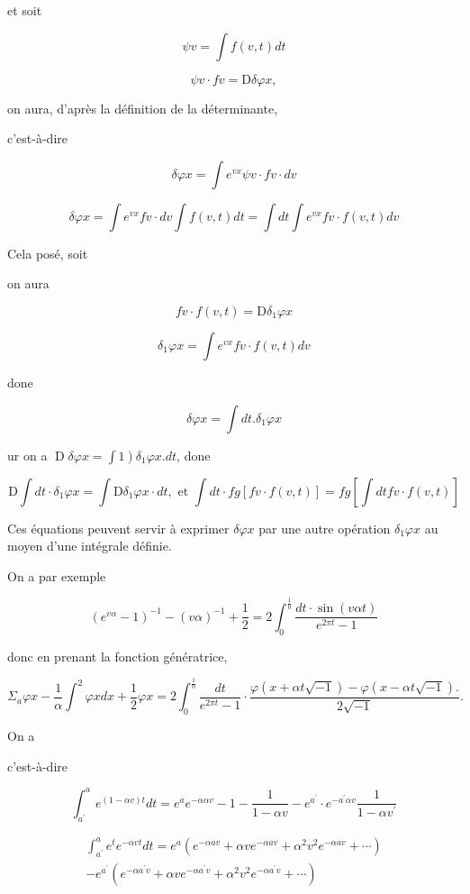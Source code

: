 \documentclass{article}
\begin{document}
et soit

\[
\psi v=\int f(v, t) d t
\]

\[
\psi v \cdot f v=\mathrm{D} \delta \varphi x,
\]

on aura, d'après la définition de la déterminante,

c'est-à-dire

\[
\delta \varphi x=\int e^{v x} \psi v \cdot f v \cdot d v
\]

\[
\delta \varphi x=\int e^{v x} f v \cdot d v \int f(v, t) d t=\int d t \int e^{v x} f v \cdot f(v, t) d v
\]

Cela posé, soit

on aura

\[
f v \cdot f(v, t)=\mathrm{D} \delta_{1} \varphi x
\]

\[
\delta_{1} \varphi x=\int e^{v x} f v \cdot f(v, t) d v
\]

done

\[
\delta \varphi x=\int d t . \delta_{1} \varphi x
\]

ur on a \(\left.\operatorname{D} \delta \varphi x=\int 1\right) \delta_{1} \varphi x . d t\), done

\[
\mathrm{D} \int d t \cdot \delta_{1} \varphi x=\int \mathrm{D} \delta_{1} \varphi x \cdot d t, \text { et } \int d t \cdot f g[f v \cdot f(v, t)]=f g\left[\int d t f v \cdot f(v, t)\right]
\]

Ces équations peuvent servir à exprimer \(\delta \varphi x\) par une autre opération \(\delta_{1} \varphi x\) au moyen d'une intégrale définie.

On a par exemple

\[
\left(e^{v \alpha}-1\right)^{-1}-(v \alpha)^{-1}+\frac{1}{2}=2 \int_{0}^{\frac{1}{0}} \frac{d t \cdot \sin (v \alpha t)}{e^{2 \pi t}-1}
\]

donc en prenant la fonction génératrice,

\[
\Sigma_{a} \varphi x-\frac{1}{\alpha} \int^{2} \varphi x d x+\frac{1}{2} \varphi x=2 \int_{0}^{\frac{1}{0}} \frac{d t}{e^{2 \pi t}-1} \cdot \frac{\varphi(x+\alpha t \sqrt{-1})-\varphi(x-\alpha t \sqrt{-1}) .}{2 \sqrt{-1}} .
\]

On a

c'est-à-dire

\[
\int_{a^{\prime}}^{a} e^{(1-\alpha v) t} d t=e^{a} e^{-\alpha \alpha v}-1-\frac{1}{1-\alpha v}-e^{a^{\prime}} \cdot e^{-a^{\prime} \alpha v} \frac{1}{1-\alpha v^{\prime}}
\]

\[
\begin{array}{r}
\int_{a^{\prime}}^{a} e^{t} e^{-\alpha v t} d t=e^{a}\left(e^{-\alpha a v}+\alpha v e^{-\alpha a v}+\alpha^{2} v^{2} e^{-\alpha a v}+\cdots\right) \\
-e^{a^{\prime}}\left(e^{-\alpha a^{\prime} v}+\alpha v e^{-\alpha a^{\prime} v}+\alpha^{2} v^{2} e^{-\alpha a^{\prime} v}+\cdots\right)
\end{array}
\]
\end{document}
